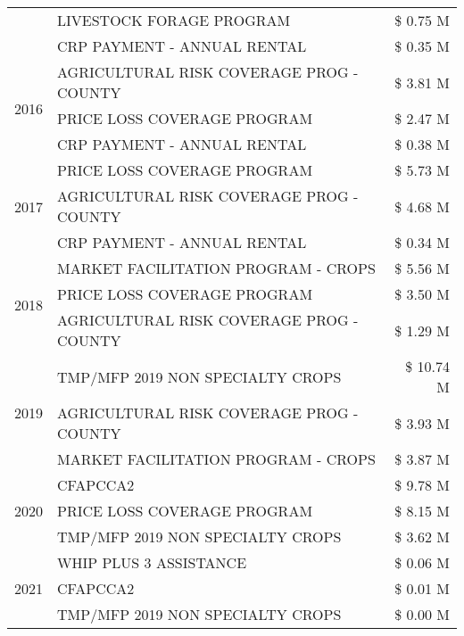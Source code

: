 \begin{tabular}{llr}
 & LIVESTOCK FORAGE PROGRAM & \$ 0.75 M \\
 & CRP PAYMENT - ANNUAL RENTAL & \$ 0.35 M \\
\cline{1-3}
\multirow[t]{3}{*}{2016} & AGRICULTURAL RISK COVERAGE PROG - COUNTY & \$ 3.81 M \\
 & PRICE LOSS COVERAGE PROGRAM & \$ 2.47 M \\
 & CRP PAYMENT - ANNUAL RENTAL & \$ 0.38 M \\
\cline{1-3}
\multirow[t]{3}{*}{2017} & PRICE LOSS COVERAGE PROGRAM & \$ 5.73 M \\
 & AGRICULTURAL RISK COVERAGE PROG - COUNTY & \$ 4.68 M \\
 & CRP PAYMENT - ANNUAL RENTAL & \$ 0.34 M \\
\cline{1-3}
\multirow[t]{3}{*}{2018} & MARKET FACILITATION PROGRAM - CROPS & \$ 5.56 M \\
 & PRICE LOSS COVERAGE PROGRAM & \$ 3.50 M \\
 & AGRICULTURAL RISK COVERAGE PROG - COUNTY & \$ 1.29 M \\
\cline{1-3}
\multirow[t]{3}{*}{2019} & TMP/MFP 2019 NON SPECIALTY CROPS & \$ 10.74 M \\
 & AGRICULTURAL RISK COVERAGE PROG - COUNTY & \$ 3.93 M \\
 & MARKET FACILITATION PROGRAM - CROPS & \$ 3.87 M \\
\cline{1-3}
\multirow[t]{3}{*}{2020} & CFAPCCA2 & \$ 9.78 M \\
 & PRICE LOSS COVERAGE PROGRAM & \$ 8.15 M \\
 & TMP/MFP 2019 NON SPECIALTY CROPS & \$ 3.62 M \\
\cline{1-3}
\multirow[t]{3}{*}{2021} & WHIP PLUS 3 ASSISTANCE & \$ 0.06 M \\
 & CFAPCCA2 & \$ 0.01 M \\
 & TMP/MFP 2019 NON SPECIALTY CROPS & \$ 0.00 M \\
\cline{1-3}
\bottomrule
\end{tabular}
